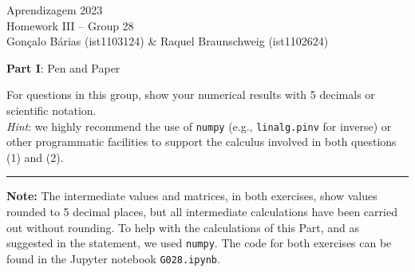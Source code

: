 \documentclass[12pt]{article}
\begin{document}
\begin{center}
  \large{Aprendizagem 2023} \\
  Homework III -- Group 28 \\
  \vskip 0.3cm
  Gonçalo Bárias (ist1103124) \& Raquel Braunschweig (ist1102624)\vskip 1cm

  \large{\textbf{Part I}: Pen and Paper}\normalsize
\end{center}

\noindent For questions in this group, show your numerical results with 5 decimals or scientific notation. \\
\textit{Hint}: we highly recommend the use of \texttt{numpy} (e.g., \texttt{linalg.pinv} for inverse) or other programmatic
facilities to support the calculus involved in both questions (1) and (2).

\vspace{5pt}
\hrule
\vspace{5pt}

\noindent \textbf{Note:} The intermediate values and matrices, in both exercises, show values rounded to 5 decimal places,
but all intermediate calculations have been carried out without rounding. To help with the calculations of this
Part, and as suggested in the statement, we used \texttt{numpy}. The code for both exercises can be found in the
Jupyter notebook \texttt{G028.ipynb}.
\end{document}
